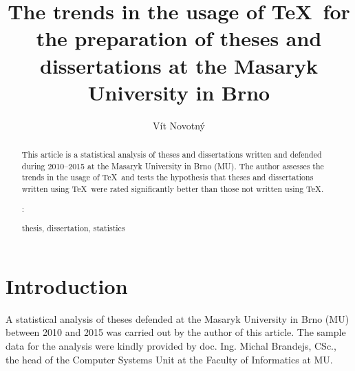 \documentclass{csbulletin}
\begin{document}
  \title{The trends in the usage of \TeX\ for the preparation of
    theses and dissertations at the Masaryk University in Brno}
  \author{Vít Novotný}
  \maketitle

  {\def\theAbstract{%
    This article is a statistical analysis of theses and
    dissertations written and defended during 2010--2015 at the
    Masaryk University in Brno (MU). The author assesses the trends
    in the usage of \TeX\ and tests the hypothesis that theses and
    dissertations written using \TeX\ were rated significantly
    better than those not written using \TeX.
    \medskip\par\keywords:\smallskip\par\noindent
    thesis, dissertation, statistics}

  \begin{abstract}\theAbstract\end{abstract}

  \let\oldtabularx\tabularx
  \let\oldendtabularx\endtabularx
  \def\tabularx{\rowcolors{1}{}{black!8}\oldtabularx}
  \def\endtabularx{\oldendtabularx}
  \def\cellemph{\cellcolor{white!70!yellow}}
  \setlength{\aboverulesep}{0pt}
  \setlength{\belowrulesep}{0pt}
  \setlength{\extrarowheight}{.75ex}

  \section{Introduction}
  A statistical analysis of theses defended at the Masaryk
  University in Brno (MU) between 2010 and 2015 was carried out by
  the author of this article. The sample data for the analysis were
  kindly provided by doc. Ing. Michal Brandejs, CSc., the head of
  the Computer Systems Unit at the Faculty of Informatics at MU.

}
\end{document}
